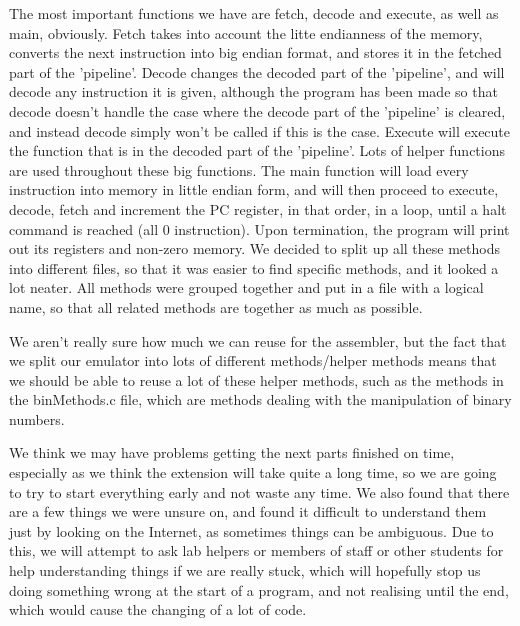 \documentclass[a4wide, 10pt]{article}
\begin{document}
                        The most important functions we have
                         are fetch, decode and execute, as well as main, obviously. Fetch takes
                          into account the litte endianness of the memory, converts the next
                           instruction into big endian format, and stores it in the fetched part
                            of the 'pipeline'. Decode changes the decoded part of the 'pipeline',
                             and will decode any instruction it is given, although the program
                              has been made so that decode doesn't handle the case where the
                               decode part of the 'pipeline' is cleared, and instead decode
                                simply won't be called if this is the case. Execute will execute
                                 the function that is in the decoded part of the 'pipeline'. Lots
                                  of helper functions are used throughout these big functions.
                                   The main function will load every instruction into memory in
                                    little endian form, and will then proceed to execute, decode,
                                     fetch and increment the PC register, in that order, in a
                                      loop, until a halt command is reached (all 0 instruction).
                                       Upon termination, the program will print out its registers
                                        and non-zero memory. We decided to split up all these
                                         methods into different files, so that it was easier to
                                          find specific methods, and it looked a lot neater. All
                                           methods were grouped together and put in a file with a
                                            logical name, so that all related methods are
                                             together as much as possible.
                                      
We aren't really sure how much we can reuse for the assembler, but the fact that we split our
 emulator into lots of different methods/helper methods means that we should be able to reuse a
  lot of these helper methods, such as the methods in the binMethods.c file, which are methods
   dealing with the manipulation of binary numbers. 

We think we may have problems getting the next parts finished on time, especially as we think the
 extension will take quite a long time, so we are going to try to start everything early and not
  waste any time. We also found that there are a few things we were unsure on, and found it
   difficult to understand them just by looking on the Internet, as sometimes things can be
    ambiguous. Due to this, we will attempt to ask lab helpers or members of staff or other
     students for help understanding things if we are really stuck, which will hopefully stop us
      doing something wrong at the start of a program, and not realising until the end, which
       would cause the changing of a lot of code.
\end{document}
